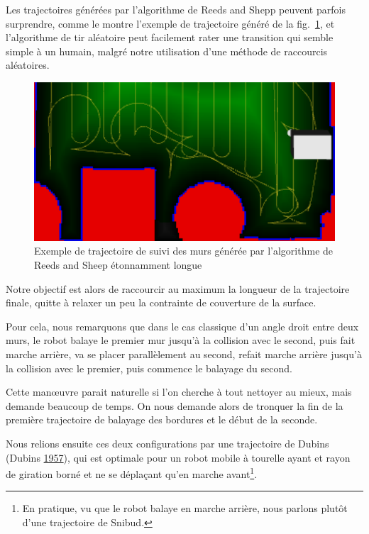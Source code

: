 \documentclass[french,A4paper,]{book}
\begin{document}
Les trajectoires générées par l'algorithme de Reeds and Shepp peuvent
parfois surprendre, comme le montre l'exemple de trajectoire généré de
la fig.~\ref{fig:toolong}, et l'algorithme de tir aléatoire peut
facilement rater une transition qui semble simple à un humain, malgré
notre utilisation d'une méthode de raccourcis aléatoires.

\begin{figure}
\centering
\includegraphics[width=1.00000\textwidth]{imgs/toolong.png}
\caption{Exemple de trajectoire de suivi des murs générée par
l'algorithme de Reeds and Sheep étonnamment longue}\label{fig:toolong}
\end{figure}

Notre objectif est alors de raccourcir au maximum la longueur de la
trajectoire finale, quitte à relaxer un peu la contrainte de couverture
de la surface.

Pour cela, nous remarquons que dans le cas classique d'un angle droit
entre deux murs, le robot balaye le premier mur jusqu'à la collision
avec le second, puis fait marche arrière, va se placer parallèlement au
second, refait marche arrière jusqu'à la collision avec le premier, puis
commence le balayage du second.

Cette manœuvre parait naturelle si l'on cherche à tout nettoyer au
mieux, mais demande beaucoup de temps. On nous demande alors de tronquer
la fin de la première trajectoire de balayage des bordures et le début
de la seconde.

Nous relions ensuite ces deux configurations par une trajectoire de
Dubins (Dubins \protect\hyperlink{ref-dubins}{1957}), qui est optimale
pour un robot mobile à tourelle ayant et rayon de giration borné et ne
se déplaçant qu'en marche avant\footnote{En pratique, vu que le robot
  balaye en marche arrière, nous parlons plutôt d'une trajectoire de
  Snibud.}.
\end{document}
